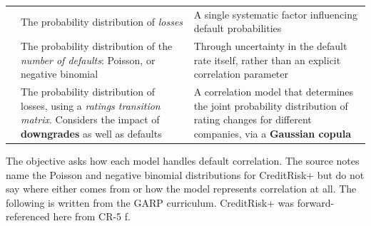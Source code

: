 \begin{center}
\footnotesize
\begin{tabular}{L{2.6cm} L{5.6cm} L{6.3cm}}
\toprule
{} &  &
 \\
\midrule
{} & The probability distribution of \emph{losses} &
  A single systematic factor influencing default probabilities \\
 & The probability distribution of the \emph{number of
  defaults}: Poisson, or negative binomial &
  Through uncertainty in the default rate itself, rather than an explicit
  correlation parameter \\
 & The probability distribution of losses, using a
  \emph{ratings transition matrix}. Considers the impact of \textbf{downgrades}
  as well as defaults &
  A correlation model that determines the joint probability distribution of
  rating changes for different companies, via a \textbf{Gaussian copula} \\
\bottomrule
\end{tabular}
\end{center}

\gapbadge

{\footnotesize\color{FRMGrey}The objective asks how each model handles default
correlation. The source notes name the Poisson and negative binomial
distributions for CreditRisk+ but do not say where either comes from or how the
model represents correlation at all. The following is written from the GARP
curriculum. CreditRisk+ was forward-referenced here from CR-5 f.}

